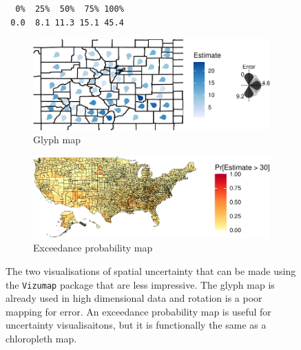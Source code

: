 \documentclass[
  letterpaper,
  DIV=11,
  numbers=noendperiod]{scrartcl}
\begin{document}
\begin{figure}

{\centering 

\begin{verbatim}
  0%  25%  50%  75% 100% 
 0.0  8.1 11.3 15.1 45.4 
\end{verbatim}

\begin{figure}

{\centering \includegraphics{confirmationreport_files/figure-pdf/fig-spatialuncert2-1.pdf}

}

\caption{Glyph map}

\end{figure}

\begin{figure}

{\centering \includegraphics{confirmationreport_files/figure-pdf/fig-spatialuncert2-2.pdf}

}

\caption{Exceedance probability map}

\end{figure}

}

\caption{\label{fig-spatialuncert2}The two visualisations of spatial
uncertainty that can be made using the \texttt{Vizumap} package that are
less impressive. The glyph map is already used in high dimensional data
and rotation is a poor mapping for error. An exceedance probability map
is useful for uncertainty visualisaitons, but it is functionally the
same as a chloropleth map.}

\end{figure}
\end{document}
